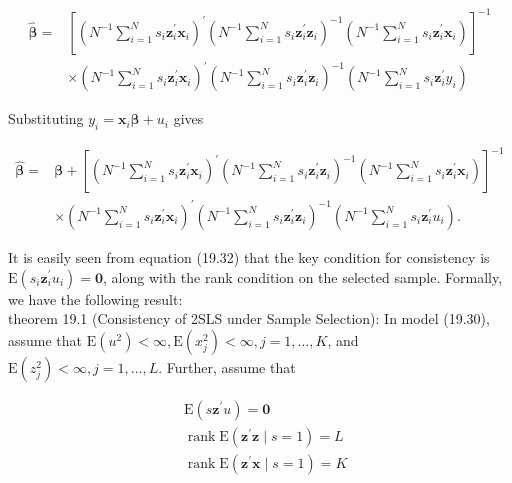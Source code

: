 \documentclass[10pt]{article}
\begin{document}
$$
\begin{aligned}
\hat{\boldsymbol{\beta}}= & {\left[\left(N^{-1} \sum_{i=1}^{N} s_{i} \mathbf{z}_{i}^{\prime} \mathbf{x}_{i}\right)^{\prime}\left(N^{-1} \sum_{i=1}^{N} s_{i} \mathbf{z}_{i}^{\prime} \mathbf{z}_{i}\right)^{-1}\left(N^{-1} \sum_{i=1}^{N} s_{i} \mathbf{z}_{i}^{\prime} \mathbf{x}_{i}\right)\right]^{-1} } \\
& \times\left(N^{-1} \sum_{i=1}^{N} s_{i} \mathbf{z}_{i}^{\prime} \mathbf{x}_{i}\right)^{\prime}\left(N^{-1} \sum_{i=1}^{N} s_{i} \mathbf{z}_{i}^{\prime} \mathbf{z}_{i}\right)^{-1}\left(N^{-1} \sum_{i=1}^{N} s_{i} \mathbf{z}_{i}^{\prime} y_{i}\right)
\end{aligned}
$$

Substituting $y_{i}=\mathbf{x}_{i} \boldsymbol{\beta}+u_{i}$ gives


\begin{align*}
\hat{\boldsymbol{\beta}}= & \boldsymbol{\beta}+\left[\left(N^{-1} \sum_{i=1}^{N} s_{i} \mathbf{z}_{i}^{\prime} \mathbf{x}_{i}\right)^{\prime}\left(N^{-1} \sum_{i=1}^{N} s_{i} \mathbf{z}_{i}^{\prime} \mathbf{z}_{i}\right)^{-1}\left(N^{-1} \sum_{i=1}^{N} s_{i} \mathbf{z}_{i}^{\prime} \mathbf{x}_{i}\right)\right]^{-1} \\
& \times\left(N^{-1} \sum_{i=1}^{N} s_{i} \mathbf{z}_{i}^{\prime} \mathbf{x}_{i}\right)^{\prime}\left(N^{-1} \sum_{i=1}^{N} s_{i} \mathbf{z}_{i}^{\prime} \mathbf{z}_{i}\right)^{-1}\left(N^{-1} \sum_{i=1}^{N} s_{i} \mathbf{z}_{i}^{\prime} u_{i}\right) . \tag{19.32}
\end{align*}


It is easily seen from equation (19.32) that the key condition for consistency is $\mathrm{E}\left(s_{i} \mathbf{z}_{i}^{\prime} u_{i}\right)=\mathbf{0}$, along with the rank condition on the selected sample. Formally, we have the following result:\\
theorem 19.1 (Consistency of 2SLS under Sample Selection): In model (19.30), assume that $\mathrm{E}\left(u^{2}\right)<\infty, \mathrm{E}\left(x_{j}^{2}\right)<\infty, j=1, \ldots, K$, and $\mathrm{E}\left(z_{j}^{2}\right)<\infty, j=1, \ldots, L$. Further, assume that


\begin{align*}
& \mathrm{E}\left(s \mathbf{z}^{\prime} u\right)=\mathbf{0}  \tag{19.33}\\
& \operatorname{rank} \mathrm{E}\left(\mathbf{z}^{\prime} \mathbf{z} \mid s=1\right)=L  \tag{19.34}\\
& \operatorname{rank} \mathrm{E}\left(\mathbf{z}^{\prime} \mathbf{x} \mid s=1\right)=K \tag{19.35}
\end{align*}
\end{document}
